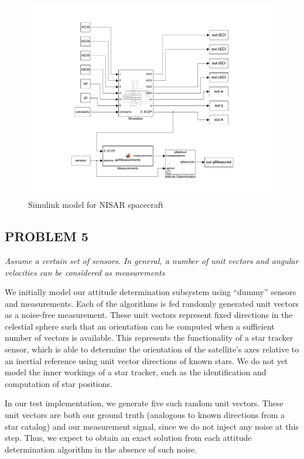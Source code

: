 \begin{figure}[H]
\centering
\includegraphics[scale=0.55]{Images/ps6_problem4.pdf}
\caption{Simulink model for NISAR spacecraft}
\label{fig:Images/ps6_problem4}
\end{figure}

\subsection{PROBLEM 5}
\textit{Assume a certain set of sensors. In general, a number of unit vectors and angular velocities can be considered as measurements}

We initially model our attitude determination subsystem using ``dummy'' sensors and measurements. Each of the algorithms is fed randomly generated unit vectors as a noise-free measurement. These unit vectors represent fixed directions in the celestial sphere such that an orientation can be computed when a sufficient number of vectors is available. This represents the functionality of a star tracker sensor, which is able to determine the orientation of the satellite's axes relative to an inertial reference using unit vector directions of known stars. We do not yet model the inner workings of a star tracker, such as the identification and computation of star positions.

In our test implementation, we generate five such random unit vectors. These unit vectors are both our ground truth (analogous to known directions from a star catalog) and our measurement signal, since we do not inject any noise at this step. Thus, we expect to obtain an exact solution from each attitude determination algorithm in the absence of such noise.

